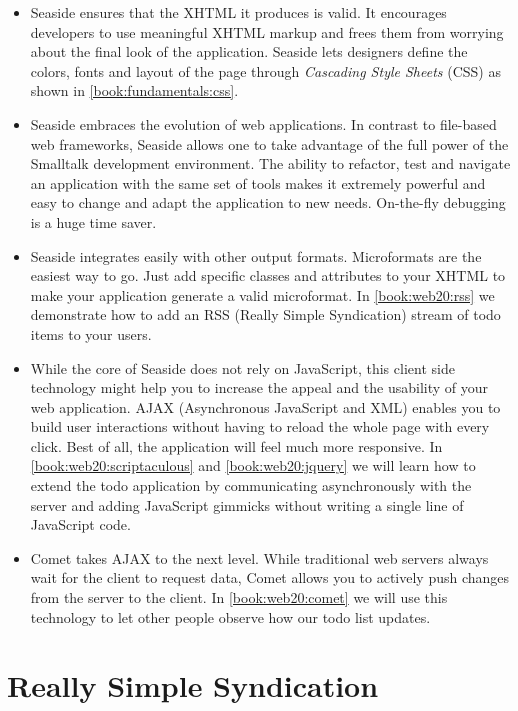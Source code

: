 \documentclass[a4paper,10pt,twoside]{book}
\begin{document}
\begin{itemize}
\item  Seaside ensures that the  XHTML it produces is valid. It encourages developers to use meaningful XHTML markup and frees them from worrying about the final look of the application. Seaside lets designers define the colors, fonts and layout of the page through \textit{Cascading Style Sheets} (CSS) as shown in \autoref{book:fundamentals:css}.
\item  Seaside embraces the evolution of web applications. In contrast to file-based web frameworks, Seaside allows one to take advantage of the full power of the Smalltalk development environment. The ability to refactor, test and navigate an application with the same set of tools makes it extremely powerful and easy to change and adapt the application to new needs. On-the-fly debugging is a huge time saver.
\item  Seaside integrates easily with other output formats.  Microformats are the easiest way to go. Just add specific classes and attributes to your XHTML to make your application generate a valid microformat. In \autoref{book:web20:rss} we demonstrate how to add an  RSS (Really Simple Syndication) stream of todo items to your users.
\item  While the core of Seaside does not rely on  JavaScript, this client side technology might help you to increase the appeal and the usability of your web application.  AJAX (Asynchronous JavaScript and XML) enables you to build user interactions without having to reload the whole page with every click. Best of all, the application will feel much more responsive. In \autoref{book:web20:scriptaculous} and \autoref{book:web20:jquery} we will learn how to extend the todo application by communicating asynchronously with the server and adding JavaScript gimmicks without writing a single line of JavaScript code.
\item  Comet  takes AJAX to the next level. While traditional web servers always wait for the client to request data, Comet allows you to actively push changes from the server to the client. In \autoref{book:web20:comet} we will use this technology to let other people observe how our todo list updates.
\end{itemize}

\chapter{Really Simple Syndication}
\label{book:web20:rss}
\end{document}
